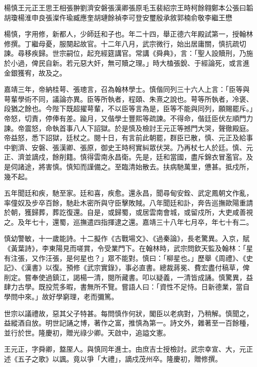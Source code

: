 
\begin{pinyinscope}
楊慎王元正王思王相張翀劉濟安磐張漢卿張原毛玉裴紹宗王時柯餘翱鄭本公張曰韜胡瓊楊淮申良張澯仵瑜臧應奎胡璉餘禎李可登安璽殷承敘郭楠俞敬李繼王懋

楊慎，字用修，新都人，少師廷和子也。年二十四，舉正德六年殿試第一，授翰林修撰。丁繼母憂，服闋起故官。十二年八月，武宗微行，始出居庸關，慎抗疏切諫。尋移疾歸。世宗嗣位，起充經筵講官。常講《舜典》，言：「聖人設贖刑，乃施於小過，俾民自新。若元惡大奸，無可贖之理。」時大榼張銳、于經論死，或言進金銀獲宥，故及之。

嘉靖三年，帝納桂萼、張璁言，召為翰林學士。慎偕同列三十六人上言：「臣等與萼輩學術不同，議論亦異。臣等所執者，程頤、朱熹之說也。萼等所執者，冷褒、段猶之餘也。今陛下既超擢萼輩，不以臣等言為是，臣等不能與同列，願賜罷斥。」帝怒，切責，停俸有差。踰月，又偕學士豐熙等疏諫。不得命，偕廷臣伏左順門力諫。帝震怒，命執首事八人下詔獄。於是慎及檢討王元正等撼門大哭，聲徹殿庭。帝益怒，悉下詔獄，廷杖之。閱十日，有言前此朝罷，群臣已散，慎、元正及給事中劉濟、安磐、張漢卿、張原，御史王時柯實糾眾伏哭。乃再杖七人於廷。慎、元正、濟並謫戍，餘削籍。慎得雲南永昌衛。先是，廷和當國，盡斥錦衣冒濫官。及是伺諸途，將害慎。慎知而謹備之。至臨清始散去。扶病馳萬里，憊甚。抵戍所，幾不起。

五年聞廷和疾，馳至家。廷和喜，疾愈。還永昌，聞尋甸安銓、武定鳳朝文作亂，率僮奴及步卒百餘，馳赴木密所與守臣擊敗賊。八年聞廷和訃，奔告巡撫歐陽重請於朝，獲歸葬，葬訖復還。自是，或歸蜀，或居雲南會城，或留戍所，大吏咸善視之。及年七十，還蜀，巡撫遣四指揮逮之還。嘉靖三十八年七月卒，年七十有二。

慎幼警敏，十一歲能詩。十二擬作《古戰場文》、《過秦論》，長老驚異。入京，賦《黃葉詩》，李東陽見而嗟賞，令受業門下。在翰林時，武宗問欽天監及翰林：「星有注張，又作汪張，是何星也？」眾不能對。慎曰：「柳星也。」歷舉《周禮》、《史記》、《漢書》以復。預修《武宗實錄》，事必直書。總裁蔣冕、費宏盡付稿草，俾削定。嘗奉使過鎮江，謁楊一清，閱所藏書。叩以疑義，一清皆成誦。慎驚異，益肆力古學。既投荒多暇，書無所不覽。嘗語人曰：「資性不足恃。日新德業，當自學問中來。」故好學窮理，老而彌篤。

世宗以議禮故，惡其父子特甚。每問慎作何狀，閣臣以老病對，乃稍解。慎聞之，益縱酒自放。明世記誦之博，著作之富，推慎為第一。詩文外，雜著至一百餘種，並行於世。隆慶初，贈光祿少卿。天啟中，追謚文憲。

王元正，字舜卿，盩厔人。與慎同年進士。由庶吉士授檢討。武宗幸宣、大，元正述《五子之歌》以諷。竟以爭「大禮」，謫戍茂州卒。隆慶初，贈修撰。


\end{pinyinscope}
